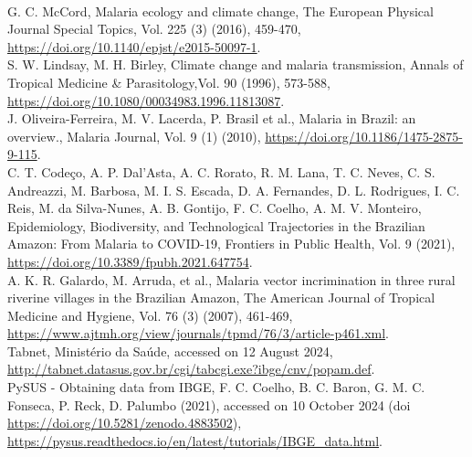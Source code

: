\documentclass[a4paper,fleqn]{cas-dc}
\begin{document}
\begin{thebibliography}{00}
\\
 G. C. McCord, Malaria ecology and climate change, The European Physical Journal Special Topics, Vol. 225 (3) (2016), 459-470, \href{https://doi.org/10.1140/epjst/e2015-50097-1}{https://doi.org/10.1140/epjst/e2015-50097-1}.
\\
 S. W. Lindsay, M. H. Birley, Climate change and malaria transmission, Annals of Tropical Medicine \& Parasitology,Vol. 90 (1996), 573-588, \href{https://doi.org/10.1080/00034983.1996.11813087}{https://doi.org/10.1080/00034983.1996.11813087}.
\\
 J. Oliveira-Ferreira, M. V. Lacerda, P. Brasil et al., Malaria in Brazil: an overview., Malaria Journal, Vol. 9 (1) (2010), \href{https://doi.org/10.1186/1475-2875-9-115}{https://doi.org/10.1186/1475-2875-9-115}.
\\
 C. T. Codeço, A. P. Dal'Asta, A. C. Rorato, R. M. Lana, T. C. Neves, C. S. Andreazzi, M. Barbosa, M. I. S. Escada, D. A. Fernandes, D. L. Rodrigues, I. C. Reis, M. da Silva-Nunes, A. B. Gontijo, F. C. Coelho, A. M. V. Monteiro, Epidemiology, Biodiversity, and Technological Trajectories in the Brazilian Amazon: From Malaria to COVID-19, Frontiers in Public Health, Vol. 9 (2021), \href{https://doi.org/10.3389/fpubh.2021.647754}{https://doi.org/10.3389/fpubh.2021.647754}.
\\
 A. K. R. Galardo, M. Arruda, et al., Malaria vector incrimination in three rural riverine villages in the Brazilian Amazon, The American Journal of Tropical Medicine and Hygiene, Vol. 76 (3) (2007), 461-469, \href{https://www.ajtmh.org/view/journals/tpmd/76/3/article-p461.xml}{https://www.ajtmh.org/view/journals/tpmd/76/3/article-p461.xml}.
\\
 Tabnet, Ministério da Saúde, accessed on 12 August 2024, \href{http://tabnet.datasus.gov.br/cgi/tabcgi.exe?ibge/cnv/popam.def}{http://tabnet.datasus.gov.br/cgi/tabcgi.exe?ibge/cnv/popam.def}.
\\
 PySUS - Obtaining data from IBGE, F. C. Coelho, B. C.  Baron, G. M. C. Fonseca, P. Reck, D. Palumbo (2021), accessed on 10 October 2024 (doi \href{https://doi.org/10.5281/zenodo.4883502}{https://doi.org/10.5281/zenodo.4883502}), \href{https://pysus.readthedocs.io/en/latest/tutorials/IBGE\_data.html}{https://pysus.readthedocs.io/en/latest/tutorials/IBGE\_data.html}.

\end{thebibliography}
\end{document}
